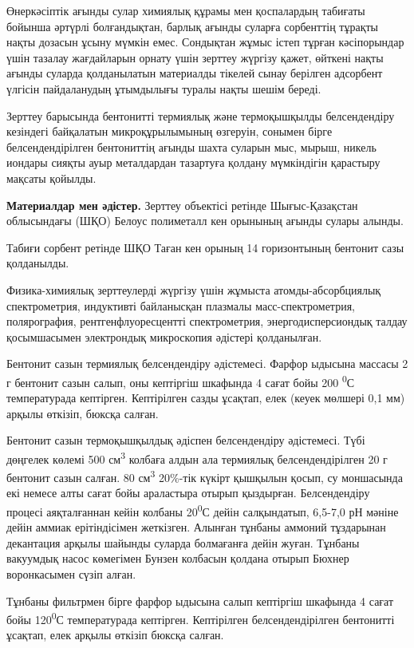 Өнеркәсіптік ағынды сулар химиялық құрамы мен қоспалардың табиғаты
бойынша әртүрлі болғандықтан, барлық ағынды суларға сорбенттің тұрақты
нақты дозасын ұсыну мүмкін емес. Сондықтан жұмыс істеп тұрған
кәсіпорындар үшін тазалау жағдайларын орнату үшін зерттеу жүргізу қажет,
өйткені нақты ағынды суларда қолданылатын материалды тікелей сынау
берілген адсорбент үлгісін пайдаланудың ұтымдылығы туралы нақты шешім
береді.

Зерттеу барысында бентонитті термиялық және термоқышқылды белсендендіру
кезіндегі байқалатын микроқұрылымының өзгеруін, сонымен бірге
белсендендірілген бентониттің ағынды шахта суларын мыс, мырыш, никель
иондары сияқты ауыр металдардан тазартуға қолдану мүмкіндігін қарастыру
мақсаты қойылды.

{\bfseries Материалдар мен әдістер.} Зерттеу объектісі ретінде
Шығыс-Қазақстан облысындағы (ШҚО) Белоус полиметалл кен орынының ағынды
сулары алынды.

Табиғи сорбент ретінде ШҚО Таған кен орының 14 горизонтының бентонит
сазы қолданылды.

Физика-химиялық зерттеулерді жүргізу үшін жұмыста атомды-абсорбциялық
спектрометрия, индуктивті байланысқан плазмалы масс-спектрометрия,
полярография, рентгенфлуоресцентті спектрометрия, энергодисперсиондық
талдау қосымшасымен электрондық микроскопия әдістері қолданылған.

Бентонит сазын термиялық белсендендіру әдістемесі. Фарфор ыдысына
массасы 2 г бентонит сазын салып, оны кептіргіш шкафында 4 сағат бойы
200 \textsuperscript{0}С температурада кептірген. Кептірілген сазды
ұсақтап, елек (кеуек мөлшері 0,1 мм) арқылы өткізіп, бюксқа салған.

Бентонит сазын термоқышқылдық әдіспен белсендендіру әдістемесі. Түбі
дөңгелек көлемі 500 см\textsuperscript{3} колбаға алдын ала термиялық
белсендендірілген 20 г бентонит сазын салған. 80 см\textsuperscript{3}
20\%-тік күкірт қышқылын қосып, су моншасында екі немесе алты сағат бойы
араластыра отырып қыздырған. Белсендендіру процесі аяқталғаннан кейін
колбаны 20\textsuperscript{0}С дейін салқындатып, 6,5-7,0 рН мәніне
дейін аммиак ерітіндісімен жеткізген. Алынған тұнбаны аммоний тұздарынан
декантация арқылы шайынды суларда болмағанға дейін жуған. Тұнбаны
вакуумдық насос көмегімен Бунзен колбасын қолдана отырып Бюхнер
воронкасымен сүзіп алған.

Тұнбаны фильтрмен бірге фарфор ыдысына салып кептіргіш шкафында 4 сағат
бойы 120\textsuperscript{0}С температурада кептірген. Кептірілген
белсендендірілген бентонитті ұсақтап, елек арқылы өткізіп бюксқа салған.

